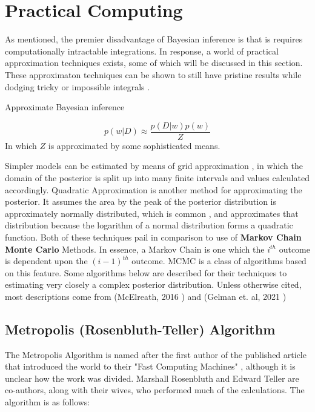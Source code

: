 \section{Practical Computing} %

 As mentioned, the premier disadvantage of Bayesian inference is that is requires computationally intractable integrations.  In response, a world of practical approximation techniques exists, some of which will be discussed in this section.  These approximaton techniques can be shown to still have pristine results while dodging tricky or impossible integrals \cite{tipping2004bayesian}.

 Approximate Bayesian inference

$$
p(w|D) \approx \frac{p(D|w)p(w)}{Z}
$$
In which $Z$ is approximated by some sophisticated means.


Simpler models can be estimated by means of grid approximation \cite{mcelreath2016statistical}, in which the domain of the posterior is split up into many finite intervals and values calculated accordingly.  Quadratic Approximation is another method for approximating the posterior.  It assumes the area by the peak of the posterior distribution is approximately normally distributed, which is common \cite{mcelreath2016statistical}, and approximates that distribution because the logarithm of a normal distribution forms a quadratic function.  Both of these techniques pail in comparison to use of \textbf{Markov Chain Monte Carlo} Methods.  In essence, a Markov Chain is one which the $i^{th}$ outcome is dependent upon the $(i-1)^{th}$ outcome.  MCMC is a class of algorithms based on this feature.  Some algorithms below are described for their techniques to estimating very closely a complex posterior distribution.  Unless otherwise cited, most descriptions come from (McElreath, 2016 \cite{mcelreath2016statistical}) and (Gelman et. al, 2021 \cite{gelmanbayesian3}) 



\subsection{Metropolis (Rosenbluth-Teller) Algorithm}

The Metropolis Algorithm is named after the first author of the published article that introduced the world to their "Fast Computing Machines" \cite{metropolis1953equation}, although it is unclear how the work was divided. Marshall Rosenbluth and Edward Teller are co-authors, along with their wives, who performed much of the calculations.  The algorithm is as follows:

